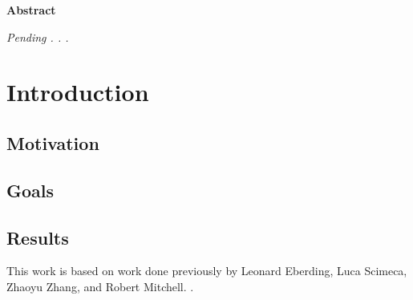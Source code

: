 \documentclass[a4paper,11pt,twoside,openright]{article}
\let\oldsection\section
\def\section{\cleardoublepage\oldsection}
\begin{document}
\newpage
\thispagestyle{empty}
\mbox{}
\newpage

\centering
{\LARGE\textbf{Abstract}}
\begin{flushleft}
  {\small \textit{Pending . . .}}
\end{flushleft}

\newpage

\tableofcontents
\newpage

\listoffigures
\newpage

\listoftables
\newpage
\thispagestyle{empty}
\mbox{}
\newpage


\raggedright
\section{ Introduction }


\subsection{ Motivation }

\subsection { Goals }

\subsection { Results }
This work is based on work done previously by Leonard Eberding, Luca Scimeca,
Zhaoyu Zhang, and Robert Mitchell.
\cite{Eberding2016, Scimeca2017, Zhang2017, Mitchell2018}.
\newline
\end{document}
